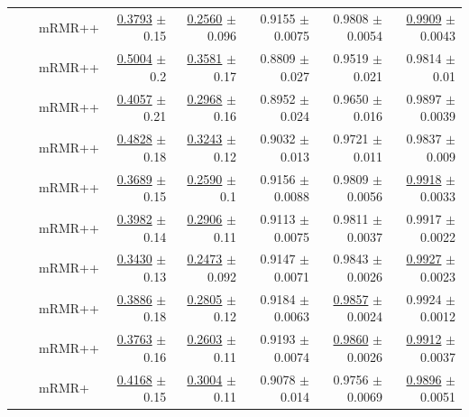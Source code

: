 \begin{longtable}{llp{}rrrrr}
 &  & mRMR++ & \underline{0.3793} {\scriptsize $\pm$ 0.15} & \underline{0.2560} {\scriptsize $\pm$ 0.096} & 0.9155 {\scriptsize $\pm$ 0.0075} & 0.9808 {\scriptsize $\pm$ 0.0054} & \underline{0.9909} {\scriptsize $\pm$ 0.0043} \\
 &  & mRMR++ & \underline{0.5004} {\scriptsize $\pm$ 0.2} & \underline{0.3581} {\scriptsize $\pm$ 0.17} & 0.8809 {\scriptsize $\pm$ 0.027} & 0.9519 {\scriptsize $\pm$ 0.021} & 0.9814 {\scriptsize $\pm$ 0.01} \\
 &  & mRMR++ & \underline{0.4057} {\scriptsize $\pm$ 0.21} & \underline{0.2968} {\scriptsize $\pm$ 0.16} & 0.8952 {\scriptsize $\pm$ 0.024} & 0.9650 {\scriptsize $\pm$ 0.016} & 0.9897 {\scriptsize $\pm$ 0.0039} \\
 &  & mRMR++ & \underline{0.4828} {\scriptsize $\pm$ 0.18} & \underline{0.3243} {\scriptsize $\pm$ 0.12} & 0.9032 {\scriptsize $\pm$ 0.013} & 0.9721 {\scriptsize $\pm$ 0.011} & 0.9837 {\scriptsize $\pm$ 0.009} \\
 &  & mRMR++ & \underline{0.3689} {\scriptsize $\pm$ 0.15} & \underline{0.2590} {\scriptsize $\pm$ 0.1} & 0.9156 {\scriptsize $\pm$ 0.0088} & 0.9809 {\scriptsize $\pm$ 0.0056} & \underline{0.9918} {\scriptsize $\pm$ 0.0033} \\
 &  & mRMR++ & \underline{0.3982} {\scriptsize $\pm$ 0.14} & \underline{0.2906} {\scriptsize $\pm$ 0.11} & 0.9113 {\scriptsize $\pm$ 0.0075} & 0.9811 {\scriptsize $\pm$ 0.0037} & 0.9917 {\scriptsize $\pm$ 0.0022} \\
 &  & mRMR++ & \underline{0.3430} {\scriptsize $\pm$ 0.13} & \underline{0.2473} {\scriptsize $\pm$ 0.092} & 0.9147 {\scriptsize $\pm$ 0.0071} & 0.9843 {\scriptsize $\pm$ 0.0026} & \underline{0.9927} {\scriptsize $\pm$ 0.0023} \\
 &  & mRMR++ & \underline{0.3886} {\scriptsize $\pm$ 0.18} & \underline{0.2805} {\scriptsize $\pm$ 0.12} & 0.9184 {\scriptsize $\pm$ 0.0063} & \underline{0.9857} {\scriptsize $\pm$ 0.0024} & 0.9924 {\scriptsize $\pm$ 0.0012} \\
 &  & mRMR++ & \underline{0.3763} {\scriptsize $\pm$ 0.16} & \underline{0.2603} {\scriptsize $\pm$ 0.11} & 0.9193 {\scriptsize $\pm$ 0.0074} & \underline{0.9860} {\scriptsize $\pm$ 0.0026} & \underline{0.9912} {\scriptsize $\pm$ 0.0037} \\
 &  & mRMR+ & \underline{0.4168} {\scriptsize $\pm$ 0.15} & \underline{0.3004} {\scriptsize $\pm$ 0.11} & 0.9078 {\scriptsize $\pm$ 0.014} & 0.9756 {\scriptsize $\pm$ 0.0069} & \underline{0.9896} {\scriptsize $\pm$ 0.0051} \\

\end{longtable}
